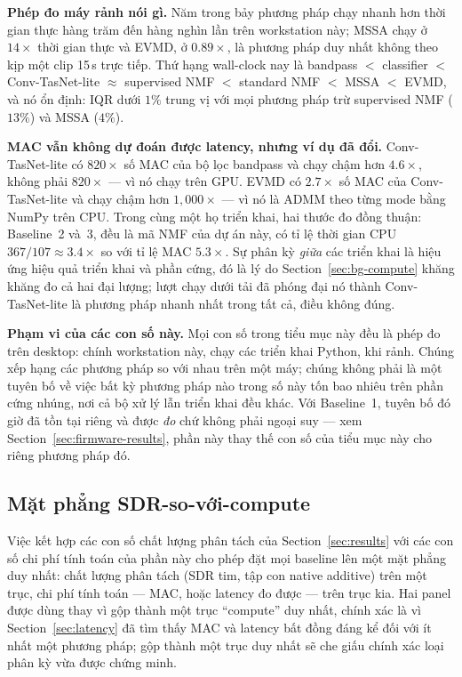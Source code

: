 \documentclass[11pt]{article}
\begin{document}
\textbf{Phép đo máy rảnh nói gì.} Năm trong bảy phương pháp chạy nhanh
hơn thời gian thực hàng trăm đến hàng nghìn lần trên workstation này;
MSSA chạy ở $14\times$ thời gian thực và EVMD, ở $0.89\times$, là phương
pháp duy nhất không theo kịp một clip 15\,s trực tiếp. Thứ hạng wall-clock
nay là bandpass $<$ classifier $<$ Conv-TasNet-lite $\approx$ supervised
NMF $<$ standard NMF $<$ MSSA $<$ EVMD, và nó ổn định: IQR dưới $1\%$
trung vị với mọi phương pháp trừ supervised NMF ($13\%$) và MSSA ($4\%$).

\textbf{MAC vẫn không dự đoán được latency, nhưng ví dụ đã đổi.}
Conv-TasNet-lite có $820\times$ số MAC của bộ lọc bandpass và chạy chậm
hơn $4.6\times$, không phải $820\times$ --- vì nó chạy trên GPU. EVMD có
$2.7\times$ số MAC của Conv-TasNet-lite và chạy chậm hơn $1{,}000\times$ ---
vì nó là ADMM theo từng mode bằng NumPy trên CPU. Trong cùng một họ triển
khai, hai thước đo đồng thuận: Baseline~2 và~3, đều là mã NMF của dự án
này, có tỉ lệ thời gian CPU $367/107 \approx 3.4\times$ so với tỉ lệ MAC
$5.3\times$. Sự phân kỳ \emph{giữa} các triển khai là hiệu ứng hiệu quả
triển khai và phần cứng, đó là lý do Section~\ref{sec:bg-compute} khăng
khăng đo cả hai đại lượng; lượt chạy dưới tải đã phóng đại nó thành
Conv-TasNet-lite là phương pháp nhanh nhất trong tất cả, điều không đúng.

\textbf{Phạm vi của các con số này.} Mọi con số trong tiểu mục này đều là
phép đo trên desktop: chính workstation này, chạy các triển khai Python,
khi rảnh. Chúng xếp hạng các phương pháp so với nhau trên một máy; chúng
không phải là một tuyên bố về việc bất kỳ phương pháp nào trong số này
tốn bao nhiêu trên phần cứng nhúng, nơi cả bộ xử lý lẫn triển khai đều
khác. Với Baseline~1, tuyên bố đó giờ đã tồn tại riêng và được \emph{đo}
chứ không phải ngoại suy --- xem Section~\ref{sec:firmware-results}, phần
này thay thế con số của tiểu mục này cho riêng phương pháp đó.

\subsection{Mặt phẳng SDR-so-với-compute}
\label{sec:compute-plane}

Việc kết hợp các con số chất lượng phân tách của Section~\ref{sec:results}
với các con số chi phí tính toán của phần này cho phép đặt mọi baseline
lên một mặt phẳng duy nhất: chất lượng phân tách (SDR tim, tập con
native additive) trên một trục, chi phí tính toán --- MAC, hoặc latency
đo được --- trên trục kia. Hai panel được dùng thay vì gộp thành một
trục ``compute'' duy nhất, chính xác là vì Section~\ref{sec:latency} đã
tìm thấy MAC và latency bất đồng đáng kể đối với ít nhất một phương
pháp; gộp thành một trục duy nhất sẽ che giấu chính xác loại phân kỳ vừa
được chứng minh.
\end{document}
